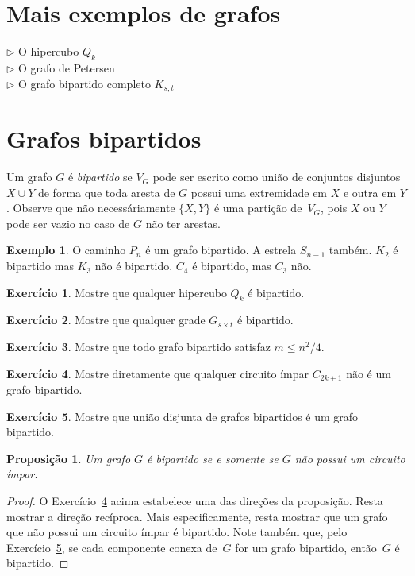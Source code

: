 \documentclass[12pt, a4paper]{article}
\newtheorem{prop}[teor]{Proposição}
\theoremstyle{definition}
\newtheorem{exem}[teor]{Exemplo}
\newtheorem{exer}{Exercício}
\begin{document}
\section{Mais exemplos de grafos}

$\rhd$ O hipercubo $Q_k$\\
$\rhd$ O grafo de Petersen\\
$\rhd$ O grafo bipartido completo $K_{s,t}$


\section {Grafos bipartidos}

Um grafo $G$ é \emph{bipartido} se $V_G$ pode ser escrito como união de conjuntos disjuntos $X \cup Y$ de forma que toda aresta de $G$ possui uma extremidade em $X$ e outra em $Y$. Observe que não necessáriamente $\{X,Y\}$ é uma partição de~$V_G$, pois $X$ ou $Y$ pode ser vazio no caso de $G$ não ter arestas.

\begin{exem}
O caminho $P_n$ é um grafo bipartido. A estrela $S_{n-1}$ também. $K_2$ é bipartido mas $K_3$ não é bipartido. $C_4$ é bipartido, mas $C_3$ não.
\end{exem}

\begin{exer}
Mostre que qualquer hipercubo $Q_k$ é bipartido. 
\end{exer}

\begin{exer}
Mostre que qualquer grade $G_{s \times t}$ é bipartido.
\end{exer}

\begin{exer}
Mostre que todo grafo bipartido satisfaz $m \leq n^2/4$.
\end{exer}

\begin{exer}
\label{exer:cimpar}
Mostre diretamente que qualquer circuito ímpar $C_{2k+1}$ não é um grafo bipartido.
\end{exer}

\begin{exer}
\label{exer:uni_bip}
Mostre que união disjunta de grafos bipartidos é um grafo bipartido.
\end{exer}

\begin{prop}
Um grafo $G$ é bipartido se e somente se $G$ não possui um circuito ímpar. 
\end{prop}

\begin{proof}
O Exercício~\ref{exer:cimpar} acima estabelece uma das direções da proposição. Resta mostrar a direção recíproca. Mais especificamente, resta mostrar que um grafo que não possui um circuito ímpar é bipartido. 
Note também que, pelo Exercício~\ref{exer:uni_bip}, se cada componente conexa de~$G$ for um grafo bipartido, então~$G$ é bipartido.
\end{proof}



\end{document}
